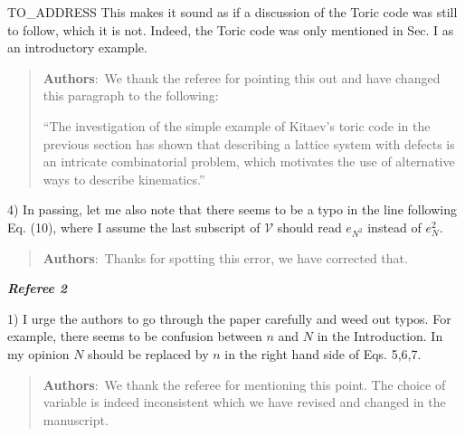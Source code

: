 \documentclass[a4paper,10pt]{letter}
\begin{document}
\begin{letter}{TO_ADDRESS}
This makes it sound as if a discussion of the Toric code was still to 
follow, which it is not. Indeed, the Toric code was only mentioned in 
Sec. I as an introductory example. 

\begin{quote}
	\textbf{Authors}:\ We thank the referee for pointing this out and have changed this paragraph to the following:
		
	``The investigation of the simple example of Kitaev's toric code in the previous section has shown that describing a lattice system with defects is an intricate combinatorial problem, which motivates the use of alternative ways to describe kinematics.''
\end{quote}

4) In passing, let me also note that there seems to be a typo in the 
line following Eq. (10), where I assume the last subscript of 
$\mathcal{V}$ should read $e_{N^2}$ instead of $e_N^2$.

\begin{quote}
	\textbf{Authors}:\ Thanks for spotting this error, we have corrected that.
\end{quote}


\begin{center}
	\textit{\textbf{Referee 2}}
\end{center}

1) I urge the authors to go through the paper carefully and weed out 
typos. For example, there seems to be confusion between $n$ and $N$ in the 
Introduction. In my opinion $N$ should be replaced by $n$ in the right 
hand side of Eqs. 5,6,7.

\begin{quote}
	\textbf{Authors}:\ We thank the referee for mentioning this point. The choice of variable is indeed inconsistent which we have revised and changed in the manuscript.
\end{quote}

\end{letter}
\end{document}
